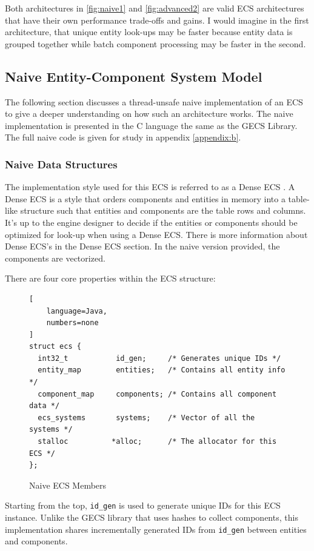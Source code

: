 Both architectures in \ref{fig:naive1} and \ref{fig:advanced2} are valid ECS architectures that have their own performance trade-offs and gains. I would imagine in the first architecture, that unique entity look-ups may be faster because entity data is grouped together while batch component processing may be faster in the second. 

\subsection{Naive Entity-Component System Model}
\label{sec:ecs_naive}
The following section discusses a thread-unsafe naive implementation of an ECS to give a deeper understanding on how such an architecture works. The naive implementation is presented in the C language the same as the GECS Library. The full naive code is given for study in appendix \ref{appendix:b}.

\subsubsection{Naive Data Structures}
The implementation style used for this ECS is referred to as a Dense ECS \cite{EnTT_SparseSets}. A Dense ECS is a style that orders components and entities in memory into a table-like structure such that entities and components are the table rows and columns. It's up to the engine designer to decide if the entities or components should be optimized for look-up when using a Dense ECS. There is more information about Dense ECS's in the Dense ECS section. In the naive version provided, the components are vectorized.

There are four core properties within the ECS structure:

\begin{figure}[H]
\begin{lstlisting}[
    language=Java,
    numbers=none
]
struct ecs {
  int32_t           id_gen;     /* Generates unique IDs */
  entity_map        entities;   /* Contains all entity info */
  component_map     components; /* Contains all component data */
  ecs_systems       systems;    /* Vector of all the systems */
  stalloc          *alloc;      /* The allocator for this ECS */
};
\end{lstlisting}
    \caption{Naive ECS Members}
    \label{code:naive_ecs_data}
\end{figure}

Starting from the top, \texttt{id\_gen} is used to generate unique IDs for this ECS instance. Unlike the GECS library that uses hashes to collect components, this implementation shares incrementally generated IDs from \texttt{id\_gen} between entities and components.

